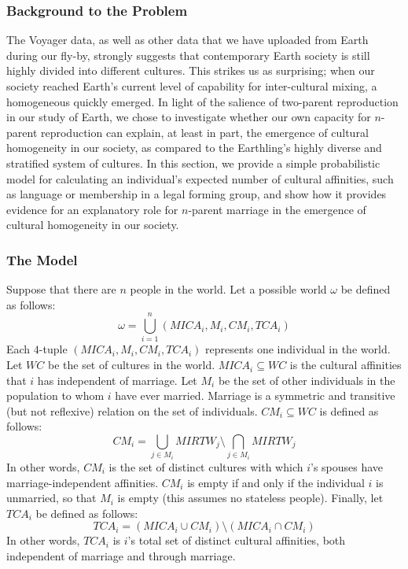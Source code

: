 
\subsubsection{Background to the Problem}
The Voyager data, as well as other data that we have uploaded from Earth during our fly-by, strongly suggests that contemporary Earth society is still highly divided into different cultures. This strikes us as surprising; when our society reached Earth's current level of capability for inter-cultural mixing, a homogeneous quickly emerged. In light of the salience of two-parent reproduction in our study of Earth, we chose to investigate whether our own capacity for $n$-parent reproduction can explain, at least in part, the emergence of cultural homogeneity in our society, as compared to the Earthling's highly diverse and stratified system of cultures. In this section, we provide a simple probabilistic model for calculating an individual's expected number of cultural affinities, such as language or membership in a legal forming group, and show how it provides evidence for an explanatory role for $n$-parent marriage in the emergence of cultural homogeneity in our society.

\subsubsection{The Model}
Suppose that there are $n$ people in the world. Let a possible world $\omega$ be defined as follows:
\begin{equation}
    \omega = \bigcup_{i=1}^{n}(MICA_{i}, M_{i}, CM_{i}, TCA_{i})
\end{equation}
Each $4$-tuple $(MICA_{i}, M_{i}, CM_{i}, TCA_{i})$ represents one individual in the world. Let $WC$ be the set of cultures in the world. $MICA_{i}\subseteq WC$ is the cultural affinities that $i$ has independent of marriage. Let $M_{i}$ be the set of other individuals in the population to whom $i$ have ever married. Marriage is a symmetric and transitive (but not reflexive) relation on the set of individuals. $CM_{i}\subseteq WC$ is defined as follows:
\begin{equation}
    CM_{i}=\bigcup_{j\in M_{i}}MIRTW_{j}\setminus\bigcap_{j\in M_{i}}MIRTW_{j}
\end{equation}
In other words, $CM_{i}$ is the set of distinct cultures with which $i$'s spouses have marriage-independent affinities. $CM_{i}$ is empty if and only if the individual $i$ is unmarried, so that $M_{i}$ is empty (this assumes no stateless people). Finally, let $TCA_{i}$ be defined as follows:
\begin{equation}
    TCA_{i}=(MICA_{i}\cup CM_{i})\setminus (MICA_{i}\cap CM_{i})
\end{equation}
In other words, $TCA_{i}$ is $i$'s total set of distinct cultural affinities, both independent of marriage and through marriage.\par 

